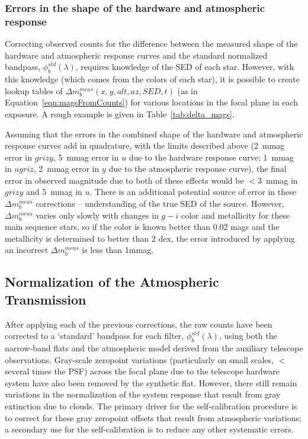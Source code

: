 \documentclass[12pt,preprint]{aastex}
\begin{document}
\subsubsection{Errors in the shape of the hardware and atmospheric response}
\label{sec:apply_deltak}

Correcting observed counts for the difference between the measured
shape of the hardware and atmospheric response curves and the standard
normalized bandpass, $\phi_b^{std}(\lambda)$, requires knowledge of the
SED of each star. However, with this knowledge (which comes from the
colors of each star), it is possible to
create lookup tables of $\Delta m_b^{meas}(x,y,alt,az,SED,t)$ (as in
Equation~\ref{eqn:magsFromCounts}) for various locations in the focal
plane in each exposure. A rough example is given in
Table~\ref{tab:delta_mags}.

Assuming that the errors in the combined shape of the hardware and
atmospheric response curves add in quadrature, with the limits
described above (2~mmag error in $grizy$, 5~mmag error in $u$ due to
the hardware response curve; 1~mmag in $ugriz$, 2~mmag error in $y$
due to the atmospheric response curve), the final error in observed
magnitude due to both of these effects would be $<3$~mmag in $grizy$
and 5~mmag in $u$. There is an additional potential source of error in
these $\Delta m_b^{meas}$ corrections -- understanding of the true SED
of the source.  However, $\Delta m_b^{meas}$ varies only slowly with
changes in $g-i$ color and metallicity for these main sequence stars,
so if the color is known better than 0.02 mags and the metallicity is
determined to better than 2 dex, the error introduced by applying an
incorrect $\Delta m_b^{meas}$ is less than 1mmag.

\subsection{Normalization of the Atmospheric Transmission}
\label{sec:atmo_norm}

After applying each of the previous corrections, the raw counts have
been corrected to a `standard' bandpass for each filter,
$\phi_b^{std}(\lambda)$, using both the narrow-band flats and the
atmospheric model derived from the auxiliary telescope
observations. Gray-scale zeropoint variations (particularly on small
scales, $<$ several times the PSF) across the focal plane due to the
telescope hardware system have also been removed by the synthetic
flat. However, there still remain variations in the normalization of
the system response that result from gray extinction due to
clouds. The primary driver for the self-calibration procedure is to
correct for these gray zeropoint offsets that result from
atmospheric variations; a secondary use for the self-calibration is
to reduce any other systematic errors. 
\end{document}
